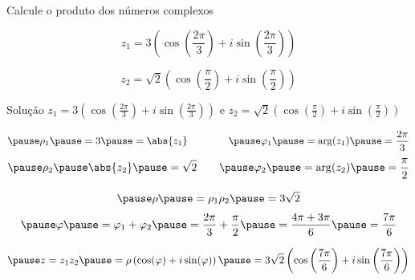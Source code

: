 \begin{question}
  Calcule o produto dos números complexos

  \[
    z_1 = 3\left(\cos\left(\frac{2\pi}{3}\right) + i\sin\left(\frac{2\pi}{3}\right)\right)
  \]

  \[
    z_2 = \sqrt{2}\left(\cos\left(\frac{\pi}{2}\right) + i\sin\left(\frac{\pi}{2}\right)\right)
  \]
\end{question}

\begin{resolution}{Solução}
  \(z_1 = 3\left(\cos\left(\frac{2\pi}{3}\right) + i\sin\left(\frac{2\pi}{3}\right)\right)\) e
  \(z_2 = \sqrt{2}\left(\cos\left(\frac{\pi}{2}\right) + i\sin\left(\frac{\pi}{2}\right)\right)\)

  \[
    \pause \rho_1
    \pause = 3
    \pause = \abs{z_1}
    \qquad\qquad
    \pause \varphi_1
    \pause = \arg(z_1)
    \pause = \frac{2\pi}{3}
  \]
  \[
    \pause \rho_2
    \pause \abs{z_2}
    \pause = \sqrt{2}
    \qquad
    \pause \varphi_2
    \pause = \arg(z_2)
    \pause = \frac{\pi}{2}
  \]

  \[
    \pause
    \rho
    \pause
    = \rho_1 \rho_2
    \pause
    = 3\sqrt{2}
  \]
  \[
    \pause
    \varphi
    \pause
    = \varphi_1 + \varphi_2
    \pause
    = \frac{2\pi}{3} + \frac{\pi}{2}
    \pause
    = \frac{4\pi + 3\pi}{6}
    \pause
    = \frac{7\pi}{6}
  \]

  \[
    \pause
    z = z_1 z_2
    \pause
    = \rho\left(\cos(\varphi)+i\sin(\varphi)\right)
    \pause
    = 3\sqrt{2}\left(\cos\left(\frac{7\pi}{6}\right)+i\sin\left(\frac{7\pi}{6}\right)\right)
  \]
\end{resolution}


